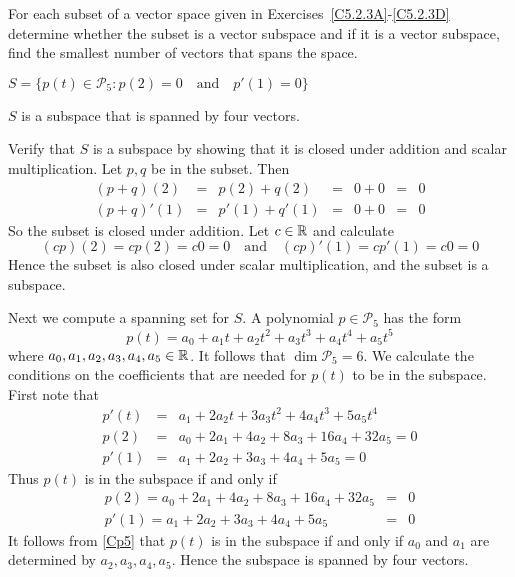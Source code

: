 \documentclass{ximera}
\author{Marty Golubitsky}
\begin{document}
For each subset of a vector space given in Exercises~\eqref{C5.2.3A}-\eqref{C5.2.3D} determine whether the subset is a vector subspace and if it is a vector subspace, find the smallest number of vectors that spans the space.

\begin{exercise}\label{C5.2.3A}

$S = \{p(t)\in\mathcal{P}_5 : p(2) = 0 \quad\mbox{and}\quad p'(1) = 0 \}$

\begin{solution}

\ans $S$ is a subspace that is spanned by four vectors.

\soln
Verify that $S$ is a subspace by showing that it is closed under addition and scalar multiplication.  Let $p,q$ be in the subset.  Then
\[
\begin{array}{rclclcl}
(p+q)(2) & = & p(2)+q(2) & = & 0 + 0 & = & 0 \\
(p+q)'(1) & = & p'(1)+q'(1) & = & 0 + 0 & = & 0
\end{array}
\]
So the subset is closed under addition. Let $c\in\mbox{$\Bbb{R}$}$ and calculate
\[
(cp)(2) = cp(2) = c0 = 0  \quad\mbox{and} \quad (cp)'(1) = cp'(1) = c0 = 0
\]
Hence the subset is also closed under scalar multiplication, and the subset is a subspace.

Next we compute a spanning set for $S$.  A polynomial $p\in \mathcal{P}_5 $ has the form 
\[
p(t) = a_0 + a_1t + a_2t^2 + a_3 t^3 + a_4t^4 + a_5t^5
\]
where $a_0,a_1,a_2,a_3,a_4,a_5\in\mbox{$\Bbb{R}$}$.  It follows that $\dim\mathcal{P}_5 = 6$. 
We calculate the conditions on the coefficients that are needed for $p(t)$ to be in the subspace.  First note that 
\[
\begin{array}{rcl}
p'(t) & = & a_1 + 2a_2t + 3a_3 t^2 + 4a_4t^3 + 5a_5t^4\\
p(2) & = & a_0 + 2a_1 + 4a_2 + 8a_3  + 16a_4 + 32a_5 = 0\\
p'(1) & = & a_1 + 2a_2 + 3a_3 + 4a_4 + 5a_5 = 0
\end{array}
\]
Thus $p(t)$ is in the subspace if and only if
\begin{equation} \label{Cp5}
\begin{array}{rcl}
p(2) = a_0 + 2a_1 + 4a_2 + 8a_3  + 16a_4 + 32a_5 & = & 0\\
p'(1)= a_1 + 2a_2 + 3a_3 + 4a_4 + 5a_5 & = & 0
\end{array}
\end{equation}
It follows from \eqref{Cp5} that $p(t)$ is in the subspace if and only if $a_0$ and $a_1$ are determined by $a_2,a_3,a_4,a_5$.  Hence the subspace is spanned by four vectors.
\end{solution}
\end{exercise}
\end{document}
